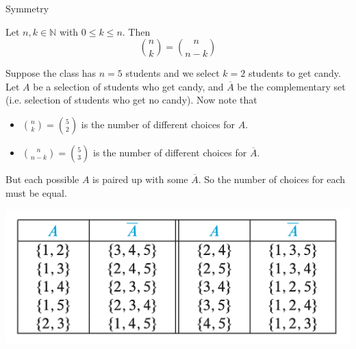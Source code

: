 \documentclass[10pt]{beamer}
\begin{document}
\begin{frame}{Symmetry}
\footnotesize 
\begin{mygreenbox}[title=Scheinerman Prop 17.7]
Let $n,k \in \mathbb{N}$ with $0 \leq k \leq n$.  Then 
\[ \binom{n}{k} =\binom{n}{n-k} \]
\end{mygreenbox}

\vfill 

\begin{myredbox}[title=\text{Example}]
Suppose the class has $n=5$ students and we select $k=2$ students to get candy.  
\vspace{0.15cm}
    Let $A$ be a selection of students who get candy, and $\overline{A}$ be the complementary set (i.e. selection of students who get no candy).  Now note that 
        \begin{itemize}
        \item $\binom{n}{k}=\binom{5}{2}$ is the number of different choices for $A$. 
        \item $\binom{n}{n-k}=\binom{5}{3}$ is the number of different choices for $\overline{A}$. 
        \end{itemize}
     But each possible $A$ is paired up with some $\overline{A}$.  So the number of choices for each must be equal. 
		\begin{center}
        \includegraphics[width=.45\textwidth]{images/symmetry_example}
        \end{center}
\end{myredbox}

\end{frame}
\end{document}
